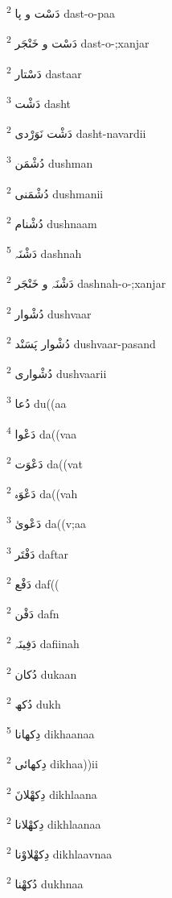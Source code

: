 \documentclass[12pt]{article}
\begin{document}
\begin{multicols}{5}
{\ur دَسْت و پا}   \textsuperscript{2} dast-o-paa

{\ur دَسْت و خَنْجَر}   \textsuperscript{2} dast-o-;xanjar

{\ur دَسْتار}   \textsuperscript{2} dastaar

{\ur دَشْت}   \textsuperscript{3} dasht

{\ur دَشْت نَوَرْدی}   \textsuperscript{2} dasht-navardii

{\ur دُشْمَن}   \textsuperscript{3} dushman

{\ur دُشْمَنی}   \textsuperscript{2} dushmanii

{\ur دُشْنام}   \textsuperscript{2} dushnaam

{\ur دَشْنَہ}   \textsuperscript{5} dashnah

{\ur دَشْنَہ و خَنْجَر}   \textsuperscript{2} dashnah-o-;xanjar

{\ur دُشْوار}   \textsuperscript{2} dushvaar

{\ur دُشْوار پَسَنْد}   \textsuperscript{2} dushvaar-pasand

{\ur دُشْواری}   \textsuperscript{2} dushvaarii

{\ur دُعا}   \textsuperscript{3} du((aa

{\ur دَعْوا}   \textsuperscript{4} da((vaa

{\ur دَعْوَت}   \textsuperscript{2} da((vat

{\ur دَعْوَہ}   \textsuperscript{2} da((vah

{\ur دَعْویٰ}   \textsuperscript{3} da((v;aa

{\ur دَفْتَر}   \textsuperscript{3} daftar

{\ur دَفْع}   \textsuperscript{2} daf((

{\ur دَفْن}   \textsuperscript{2} dafn

{\ur دَفِینَہ}   \textsuperscript{2} dafiinah

{\ur دُکان}   \textsuperscript{2} dukaan

{\ur دُکھ}   \textsuperscript{2} dukh

{\ur دِکھانا}   \textsuperscript{5} dikhaanaa

{\ur دِکھائی}   \textsuperscript{2} dikhaa))ii

{\ur دِکھْلانَ}   \textsuperscript{2} dikhlaana

{\ur دِکھْلانا}   \textsuperscript{2} dikhlaanaa

{\ur دِکھْلاوْنا}   \textsuperscript{2} dikhlaavnaa

{\ur دُکھْنا}   \textsuperscript{2} dukhnaa


\end{multicols}
\end{document}
